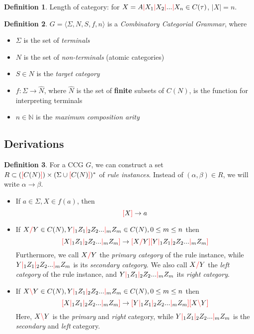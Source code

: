 \documentclass[12pt]{extarticle}
\theoremstyle{definition} \newtheorem{defn}{Definition}
\theoremstyle{definition} \newtheorem{prop}{Proposition}
\newcommand{\lc}{\textcolor{red}{\backslash}}
\newcommand{\rc}{\textcolor{red}{/}}
\newcommand{\mc}{\textcolor{red}{|}}
\newcommand{\lb}{\textcolor{red}{[}}
\newcommand{\rb}{\textcolor{red}{]}}
\begin{document}
\begin{defn}
    Length of category: for $X = A \mc X_1 \mc X_2 \mc ... \mc X_n \in C(\tau)$,
    $|X| = n$.
\end{defn}

\begin{defn}
    $ G = \langle \Sigma, N, S, f, n \rangle $ is a \emph{Combinatory Categorial Grammar}, where
    \begin{itemize}
        \item $ \Sigma $ is the set of \emph{terminals}
        \item $ N $ is the set of \emph{non-terminals} (atomic categories)
        \item $ S \in N $ is the \emph{target category}
        \item $ f : \Sigma \rightarrow \hat{N} $, where $\hat{N}$ is the set of
            \textbf{finite} subsets of $C(N)$, is the function for interpreting
            terminals
        \item $ n \in \mathbb{N} $ is the \emph{maximum composition arity}
    \end{itemize}
\end{defn}

\subsection{Derivations}

\begin{defn}
    For a CCG $G$, we can construct a set $R \subset (\lb C(N) \rb) \times (\Sigma \cup \lb C(N) \rb)^*$
    of \emph{rule instances}. Instead of $(\alpha, \beta) \in R$, we will write
    $\alpha \rightarrow \beta$.

    \begin{itemize}
        \item If $ a \in \Sigma, X \in f(a) $, then \[ \lb X \rb \rightarrow a \]
        \item If $ X \rc Y \in C(N), Y \mc_1 Z_1 \mc_2 Z_2 ... \mc_m Z_m \in C(N), 0 \leq m \leq n $
            then \[ \lb X \mc_1 Z_1 \mc_2 Z_2 ... \mc_m Z_m \rb \rightarrow \lb X \rc Y \rb \lb Y \mc_1 Z_1 \mc_2 Z_2 ... \mc_m Z_m \rb \]
            Furthermore, we call $ X \rc Y $ the \emph{primary category} of the rule
            instance, while $ Y \mc_1 Z_1 \mc_2 Z_2 ... \mc_m Z_m $ is its
            \emph{secondary category}.
            We also call $ X \rc Y $ the \emph{left category} of the rule instance,
            and $  Y \mc_1 Z_1 \mc_2 Z_2 ... \mc_m Z_m $ its \emph{right category}.
        \item If $ X \lc Y \in C(N), Y \mc_1 Z_1 \mc_2 Z_2 ... \mc_m Z_m \in C(N), 0 \leq m \leq n $
            then \[ \lb X \mc_1 Z_1 \mc_2 Z_2 ... \mc_m Z_m \rb \rightarrow \lb Y \mc_1 Z_1 \mc_2 Z_2 ... \mc_m Z_m \rb \lb X \lc Y \rb \]
            Here, $ X \lc Y $ is the \emph{primary} and \emph{right} category,
            while $ Y \mc_1 Z_1 \mc_2 Z_2 ... \mc_m Z_m $ is the \emph{secondary}
            and \emph{left} category.
    \end{itemize}
\end{defn}
\end{document}
